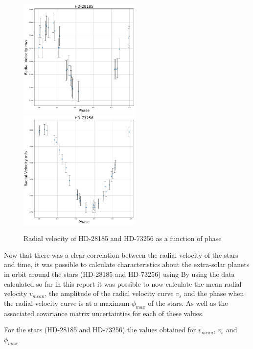 \documentclass[]{article}
\begin{document}
\begin{figure}[h]
\includegraphics[width=6cm]{images/HD-28185_phase.png}
\includegraphics[width=6cm]{images/HD-73256_phase.png}
\caption{Radial velocity of HD-28185 and HD-73256 as a function of phase}
\label{fig:HD-_phase}
\end{figure}

Now that there was a clear correlation between the radial velocity of the stars and
time, it was possible to calculate characteristics about the extra-solar planets in 
orbit around the stars (HD-28185 and HD-73256) using %
By using the data calculated so far in this report it was possible to now calculate 
the mean radial velocity $v_{mean} $, the amplitude of the radial velocity curve
 $v_{s}$ and the 
phase when the radial velocity curve is at a maximum $\phi_{max}$ of the stars.
As well as the associated covariance matrix uncertainties for each of these values.
\par
For the stars (HD-28185 and HD-73256) the values obtained for $v_{mean}$, $v_{s}$ 
and $\phi_{max}$ 
\end{document}
